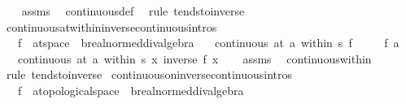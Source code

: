 \begin{isabellebody}
%
\isadelimproof
\ \ %
\endisadelimproof
%
\isatagproof
{}\isamarkupfalse%
\ assms\ \isamarkupfalse%
\ continuous{\isacharunderscore}{\kern0pt}def\ \isamarkupfalse%
\ {\isacharparenleft}{\kern0pt}rule\ tendsto{\isacharunderscore}{\kern0pt}inverse{\isacharparenright}{\kern0pt}%
\endisatagproof
{\isafoldproof}%
%
\isadelimproof
\isanewline
%
\endisadelimproof
\isanewline
{}\isamarkupfalse%
\ continuous{\isacharunderscore}{\kern0pt}at{\isacharunderscore}{\kern0pt}within{\isacharunderscore}{\kern0pt}inverse{\isacharbrackleft}{\kern0pt}continuous{\isacharunderscore}{\kern0pt}intros{\isacharbrackright}{\kern0pt}{\isacharcolon}{\kern0pt}\isanewline
\ \ \ f\ {\isacharcolon}{\kern0pt}{\isacharcolon}{\kern0pt}\ {\isachardoublequoteopen}{\isacharprime}{\kern0pt}a{\isacharcolon}{\kern0pt}{\isacharcolon}{\kern0pt}t{}{\isacharunderscore}{\kern0pt}space\ {\isasymRightarrow}\ {\isacharprime}{\kern0pt}b{\isacharcolon}{\kern0pt}{\isacharcolon}{\kern0pt}real{\isacharunderscore}{\kern0pt}normed{\isacharunderscore}{\kern0pt}div{\isacharunderscore}{\kern0pt}algebra{\isachardoublequoteclose}\isanewline
\ \ \ {\isachardoublequoteopen}continuous\ {\isacharparenleft}{\kern0pt}at\ a\ within\ s{\isacharparenright}{\kern0pt}\ f{\isachardoublequoteclose}\isanewline
\ \ \ \ \ {\isachardoublequoteopen}f\ a\ {\isasymnoteq}\ {}{\isachardoublequoteclose}\isanewline
\ \ \ {\isachardoublequoteopen}continuous\ {\isacharparenleft}{\kern0pt}at\ a\ within\ s{\isacharparenright}{\kern0pt}\ {\isacharparenleft}{\kern0pt}{\isasymlambda}x{\isachardot}{\kern0pt}\ inverse\ {\isacharparenleft}{\kern0pt}f\ x{\isacharparenright}{\kern0pt}{\isacharparenright}{\kern0pt}{\isachardoublequoteclose}\isanewline
%
\isadelimproof
\ \ %
\endisadelimproof
%
\isatagproof
{}\isamarkupfalse%
\ assms\ \isamarkupfalse%
\ continuous{\isacharunderscore}{\kern0pt}within\ \isamarkupfalse%
\ {\isacharparenleft}{\kern0pt}rule\ tendsto{\isacharunderscore}{\kern0pt}inverse{\isacharparenright}{\kern0pt}%
\endisatagproof
{\isafoldproof}%
%
\isadelimproof
\isanewline
%
\endisadelimproof
\isanewline
{}\isamarkupfalse%
\ continuous{\isacharunderscore}{\kern0pt}on{\isacharunderscore}{\kern0pt}inverse{\isacharbrackleft}{\kern0pt}continuous{\isacharunderscore}{\kern0pt}intros{\isacharbrackright}{\kern0pt}{\isacharcolon}{\kern0pt}\isanewline
\ \ \ f\ {\isacharcolon}{\kern0pt}{\isacharcolon}{\kern0pt}\ {\isachardoublequoteopen}{\isacharprime}{\kern0pt}a{\isacharcolon}{\kern0pt}{\isacharcolon}{\kern0pt}topological{\isacharunderscore}{\kern0pt}space\ {\isasymRightarrow}\ {\isacharprime}{\kern0pt}b{\isacharcolon}{\kern0pt}{\isacharcolon}{\kern0pt}real{\isacharunderscore}{\kern0pt}normed{\isacharunderscore}{\kern0pt}div{\isacharunderscore}{\kern0pt}algebra{\isachardoublequoteclose}\isanewline

\end{isabellebody}
